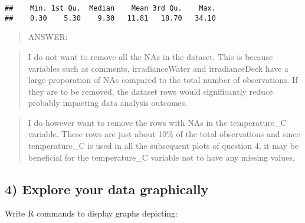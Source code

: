 \documentclass[]{article}
\newenvironment{Shaded}{\begin{snugshade}}{\end{snugshade}}
\newcommand{\KeywordTok}[1]{\textcolor[rgb]{0.13,0.29,0.53}{\textbf{#1}}}
\newcommand{\StringTok}[1]{\textcolor[rgb]{0.31,0.60,0.02}{#1}}
\newcommand{\CommentTok}[1]{\textcolor[rgb]{0.56,0.35,0.01}{\textit{#1}}}
\newcommand{\OperatorTok}[1]{\textcolor[rgb]{0.81,0.36,0.00}{\textbf{#1}}}
\newcommand{\NormalTok}[1]{#1}
\begin{document}
\begin{Shaded}
\end{Shaded}

\begin{verbatim}
##    Min. 1st Qu.  Median    Mean 3rd Qu.    Max. 
##    0.30    5.30    9.30   11.81   18.70   34.10
\end{verbatim}

\begin{quote}
ANSWER:
\end{quote}

\begin{quote}
I do not want to remove all the NAs in the dataset. This is because
variables such as comments, irradianceWater and irradianceDeck have a
large proporation of NAs compared to the total number of observations.
If they are to be removed, the dataset rows would significantly reduce
probably impacting data analysis outcomes.
\end{quote}

\begin{quote}
I do however want to remove the rows with NAs in the temperature\_C
variable. These rows are just about 10\% of the total observations and
since temperature\_C is used in all the subsequent plots of question 4,
it may be beneficial for the temperature\_C variable not to have any
missing values.
\end{quote}

\subsection{4) Explore your data
graphically}\label{explore-your-data-graphically}

Write R commands to display graphs depicting:
\end{document}

